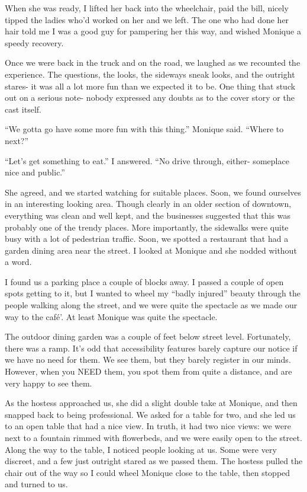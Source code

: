 When she was ready, I lifted her back into the wheelchair, paid the bill, nicely tipped the
ladies who'd worked on her and we left. The one who had done her hair told me I was a good guy
for pampering her this way, and wished Monique a speedy recovery.

Once we were back in the truck and on the road, we laughed as we recounted the experience.
The questions, the looks, the sideways sneak looks, and the outright stares- it was all a lot
more fun than we expected it to be. One thing that stuck out on a serious note- nobody expressed
any doubts as to the cover story or the cast itself.

``We gotta go have some more fun with this thing.'' Monique said. ``Where to next?''

``Let's get something to eat.'' I answered. ``No drive through, either- someplace nice and
public.''

She agreed, and we started watching for suitable places. Soon, we found ourselves in an
interesting looking area. Though clearly in an older section of downtown, everything was clean
and well kept, and the businesses suggested that this was probably one of the trendy places.
More importantly, the sidewalks were quite busy with a lot of pedestrian traffic. Soon, we
spotted a restaurant that had a garden dining area near the street. I looked at Monique and she
nodded without a word.

I found us a parking place a couple of blocks away. I passed a couple of open spots getting
to it, but I wanted to wheel my ``badly injured'' beauty through the people walking along the
street, and we were quite the spectacle as we made our way to the café'. At least Monique was
quite the spectacle.

The outdoor dining garden was a couple of feet below street level. Fortunately, there was a
ramp. It's odd that accessibility features barely capture our notice if we have no need for
them. We see them, but they barely register in our minds. However, when you NEED them, you spot
them from quite a distance, and are very happy to see them.

As the hostess approached us, she did a slight double take at Monique, and then snapped
back to being professional. We asked for a table for two, and she led us to an open table that
had a nice view. In truth, it had two nice views: we were next to a fountain rimmed with
flowerbeds, and we were easily open to the street. Along the way to the table, I noticed people
looking at us. Some were very discreet, and a few just outright stared as we passed them. The
hostess pulled the chair out of the way so I could wheel Monique close to the table, then
stopped and turned to us.

